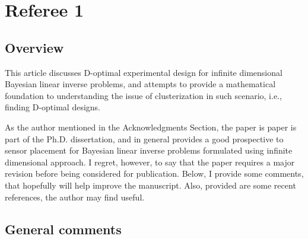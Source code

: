 \documentclass{amsart}
\numberwithin{equation}{section}
\begin{document}
\section{Referee 1}

\subsection{Overview}

This article discusses D-optimal experimental design for infinite
dimensional Bayesian linear inverse problems, and attempts to provide
a mathematical foundation to understanding the issue of clusterization
in such scenario, i.e., finding D-optimal designs.

As the author mentioned in the Acknowledgments Section, the paper is
paper is part of the Ph.D. dissertation, and in general provides a
good prospective to sensor placement for Bayesian linear inverse
problems formulated using infinite dimensional approach.  I regret,
however, to say that the paper requires a major revision before being
considered for publication.  Below, I provide some comments, that
hopefully will help improve the manuscript.  Also, provided are some
recent references, the author may find useful.

\subsection{General comments}
\end{document}
